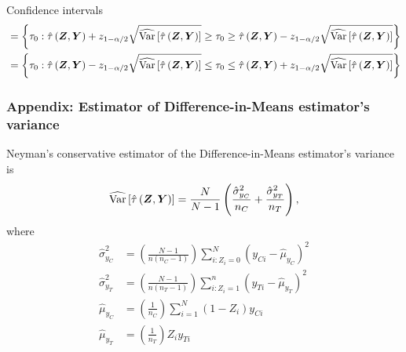 \documentclass[table, xcolor = {dvipsnames}, 9pt]{beamer}
\theoremstyle{plain}
\DeclareMathOperator{\Var}{\rm{Var}}
\begin{document}
\begin{frame}{Confidence intervals}
\begin{equation*}
\begin{split}
& = \left\{\tau_0 : \hat{\tau}\left(\bm{Z}, \bm{Y}\right)+ z_{1 - \alpha/2} \sqrt{\widehat{\Var}\left[\hat{\tau}\left(\bm{Z}, \bm{Y}\right)\right] }\geq \tau_0 \geq  \hat{\tau}\left(\bm{Z}, \bm{Y}\right)- z_{1 - \alpha/2} \sqrt{\widehat{\Var}\left[\hat{\tau}\left(\bm{Z}, \bm{Y}\right)\right] }\right\} \\ 
& = \left\{\tau_0 : \hat{\tau}\left(\bm{Z}, \bm{Y}\right)- z_{1 - \alpha/2} \sqrt{\widehat{\Var}\left[\hat{\tau}\left(\bm{Z}, \bm{Y}\right)\right] }\leq \tau_0 \leq \hat{\tau}\left(\bm{Z}, \bm{Y}\right)+ z_{1 - \alpha/2} \sqrt{\widehat{\Var}\left[\hat{\tau}\left(\bm{Z}, \bm{Y}\right)\right] }\right\}
\end{split}
\end{equation*}
\normalsize
\end{frame}


\begin{frame}[t, label = Variance estimators]
\frametitle{Appendix: Estimator of Difference-in-Means estimator's variance}
\vfill
Neyman's conservative estimator of the Difference-in-Means estimator's variance is 
\begin{equation*}
\widehat{\Var}\left[\hat{\tau}\left(\bm{Z}, \bm{Y}\right)\right] = \frac{N}{N - 1}\left(\frac{\hat{\sigma}^2_{y_C}}{n_C} + \frac{\hat{\sigma}^2_{y_T}}{n_T} \right),
\end{equation*}
where 
\begin{align*}
\hat{\sigma}^2_{y_C} & = \left(\frac{N - 1}{n\left(n_C - 1\right)}\right)\sum \limits_{i: Z_i = 0}^N \left(y_{Ci} - \hat{\mu}_{y_C}\right)^2 \\
\hat{\sigma}^2_{y_T} & = \left(\frac{N - 1}{n\left(n_T - 1\right)}\right)\sum \limits_{i: Z_i = 1}^{n} \left(y_{Ti} - \hat{\mu}_{y_T}\right)^2 \\ 
\hat{\mu}_{y_C} & = \left(\frac{1}{n_C}\right) \sum \limits_{i = 1}^N \left(1 - Z_i\right)y_{Ci} \\ 
\hat{\mu}_{y_T} & = \left(\frac{1}{n_T}\right) Z_i y_{Ti}
\end{align*}
\vfill
\end{frame}
\end{document}
